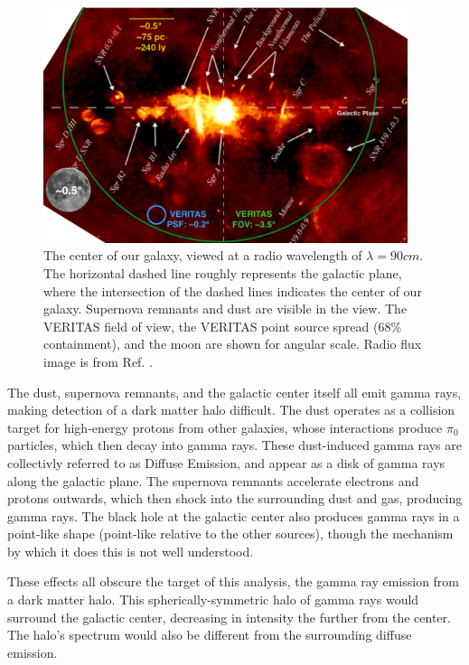 \begin{figure}[ht]
  \centering
  \includegraphics[width=0.95\textwidth]{images/GalacticCenterInRadio.eps}
  \caption[Galactic Center in Radio]{
    The center of our galaxy, viewed at a radio wavelength of $\lambda=90cm$.
    The horizontal dashed line roughly represents the galactic plane, where the intersection of the dashed lines indicates the center of our galaxy.
    Supernova remnants and dust are visible in the view.
    The VERITAS field of view, the VERITAS point source spread (68\% containment), and the moon are shown for angular scale.
    Radio flux image is from Ref. \cite{galactic_center_in_radio}.}
  \label{fig_gc_radio}
\end{figure}

The dust, supernova remnants, and the galactic center itself all emit gamma rays, making detection of a dark matter halo difficult.
The dust operates as a collision target for high-energy protons from other galaxies, whose interactions produce $\pi_0$ particles, which then decay into gamma rays.
These dust-induced gamma rays are collectivly referred to as Diffuse Emission, and appear as a disk of gamma rays along the galactic plane.
The supernova remnants accelerate electrons and protons outwards, which then shock into the surrounding dust and gas, producing gamma rays.
The black hole at the galactic center also produces gamma rays in a point-like shape (point-like relative to the other sources), though the mechanism by which it does this is not well understood\cite{gal_cent_still_undetermined}.

These effects all obscure the target of this analysis, the gamma ray emission from a dark matter halo.
This spherically-symmetric halo of gamma rays would surround the galactic center, decreasing in intensity the further from the center.
The halo's spectrum would also be different from the surrounding diffuse emission.

